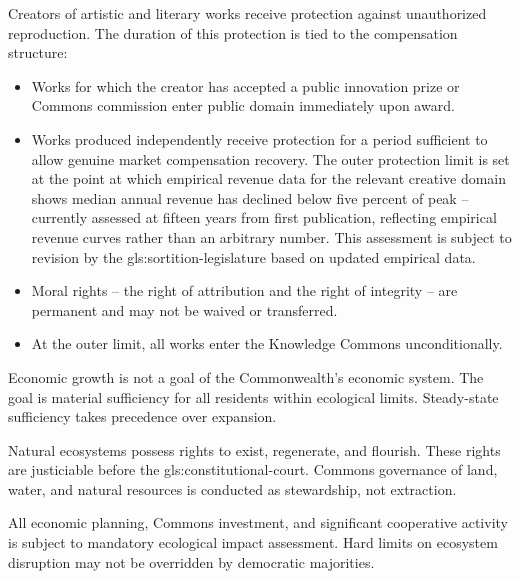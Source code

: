 Creators of artistic and literary works receive protection against unauthorized reproduction. The duration of this protection is tied to the compensation structure:
\begin{itemize}
  \item Works for which the creator has accepted a public innovation prize or Commons commission enter public domain immediately upon award.
  \item Works produced independently receive protection for a period sufficient to allow genuine market compensation recovery. The outer protection limit is set at the point at which empirical revenue data for the relevant creative domain shows median annual revenue has declined below five percent of peak -- currently assessed at fifteen years from first publication, reflecting empirical revenue curves rather than an arbitrary number. This assessment is subject to revision by the \gls{gls:sortition-legislature} based on updated empirical data.
  \item Moral rights -- the right of attribution and the right of integrity -- are permanent and may not be waived or transferred.
  \item At the outer limit, all works enter the Knowledge Commons unconditionally.
\end{itemize}


Economic growth is not a goal of the Commonwealth's economic system. The goal is material sufficiency for all residents within ecological limits. Steady-state sufficiency takes precedence over expansion.

Natural ecosystems possess rights to exist, regenerate, and flourish. These rights are justiciable before the \gls{gls:constitutional-court}. Commons governance of land, water, and natural resources is conducted as stewardship, not extraction.

All economic planning, Commons investment, and significant cooperative activity is subject to mandatory ecological impact assessment. Hard limits on ecosystem disruption may not be overridden by democratic majorities.

